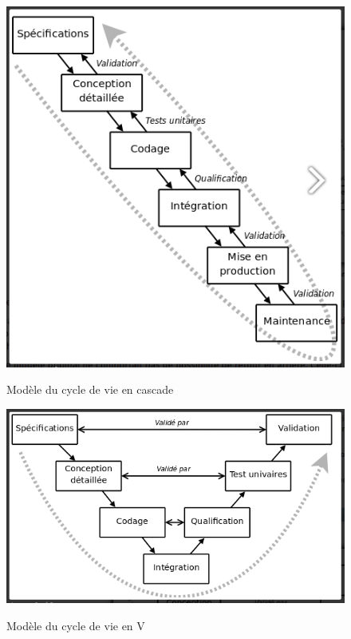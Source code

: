     \begin{figure}[t]
        \centering
        \includegraphics[scale=0.35]{images/Analyse_des_besoins/methcasc.png}
        \caption{Modèle du cycle de vie en cascade }\cite{audibert2009uml}
        \label{fig:methv}
    \end{figure}
    \begin{figure}[t]
        \centering
        \includegraphics[scale=0.35]{images/Analyse_des_besoins/methv.png}
        \caption{Modèle du cycle de vie en V }\cite{audibert2009uml}
        \label{fig:methv2}
    \end{figure}